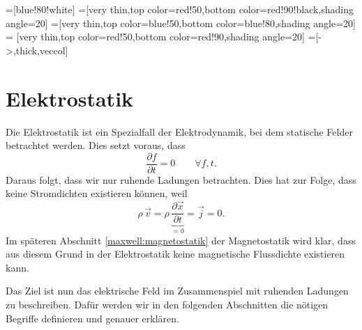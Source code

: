 %
%
%
%

\tikzset{>=latex} %
\usetikzlibrary {arrows.meta}
\pgfplotsset{compat=1.13}
\usetikzlibrary{decorations.markings,intersections,calc}
\usetikzlibrary{angles,quotes} %
=[blue!80!white]
=[very thin,top color=red!50,bottom color=red!90!black,shading angle=20]
=[very thin,top color=blue!50,bottom color=blue!80,shading angle=20]
 = [very thin,top color=red!50,bottom color=red!90,shading angle=20]
=[->,thick,veccol]


\section{Elektrostatik\label{maxwell:section:elekktrostatik}}
Die Elektrostatik ist ein Spezialfall der Elektrodynamik, bei dem statische Felder betrachtet werden.
Dies setzt voraus, dass
\begin{equation}
	\frac{\partial f}{\partial t}
	=
	0
	\qquad
	\forall f,t.
	\label{maxwell:section:definition_statik}
\end{equation}
Daraus folgt, dass wir nur ruhende Ladungen betrachten.
Dies hat zur Folge, dass keine Stromdichten existieren können, weil
\begin{equation}
	\rho\,\vec{v}
	=
	\rho\, \underbrace{\frac{\partial \vec{x}}{\partial t}}_{=0}
	=
	\vec{j}
	=
	0.
\end{equation}
Im späteren Abschnitt \ref{maxwell:magnetostatik} der Magnetostatik wird klar, dass aus diesem Grund in der Elektrostatik keine magnetische Flussdichte existieren kann.
 
Das Ziel ist nun das elektrische Feld im Zusammenspiel mit ruhenden Ladungen zu beschreiben.
Dafür werden wir in den folgenden Abschnitten die nötigen Begriffe definieren und genauer erklären.

